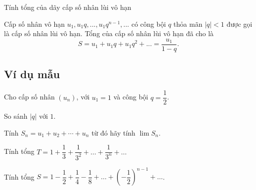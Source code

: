 

\begin{dang}{Tính tổng của dãy cấp số nhân lùi vô hạn}
		\begin{dn}
		Cấp số nhân vô hạn $u_1, u_1q,...,u_1q^{n-1},...$ có công bội $q$ thỏa mãn $|q|<1$ được gọi là cấp số nhân lùi vô hạn. 
		Tổng của cấp số nhân lùi vô hạn đã cho là $$S=u_1+u_1q+u_1q^2+...=\dfrac{u_1}{1-q}.$$
	\end{dn}
\end{dang}
\subsection*{Ví dụ mẫu}
\begin{vd}%
	Cho cấp số nhân $(u_n)$, với $u_1=1$ và công bội $q=\dfrac{1}{2}$.
	\begin{enumEX}{1}
		\item So sánh $\left|q\right|$ với $1$.
		\item Tính $S_n=u_1+u_2+\cdots+u_n$ từ đó hãy tính $\lim S_n$.
	\end{enumEX}
\end{vd}
\begin{vd}%
	Tính tổng $T=1+\dfrac{1}{3}+\dfrac{1}{3^2}+\ldots+\dfrac{1}{3^n}+\ldots$
\end{vd}
\begin{vd}
	Tính tổng $S=1-\dfrac{1}{2}+\dfrac{1}{4}-\dfrac{1}{8}+\ldots+\left(-\dfrac{1}{2}\right)^{n-1}+\ldots$.
\end{vd}

